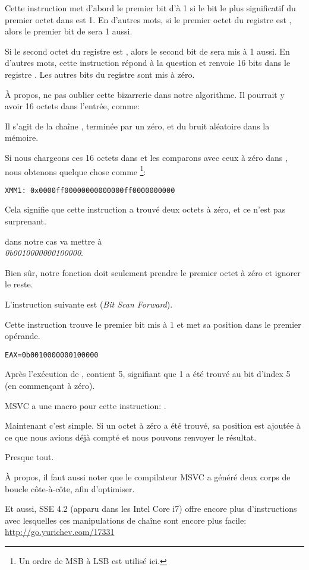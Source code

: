 Cette instruction met d'abord le premier bit d'\EAX à 1 si le bit le plus significatif
du premier octet dans  est 1.
En d'autres mots, si le premier octet du registre  est , alors le
premier bit de \EAX sera 1 aussi.

Si le second octet du registre  est , alors le second bit de \EAX
sera mis à 1 aussi.
En d'autres mots, cette instruction répond à la question  et renvoie
16 bits dans le registre \EAX.
Les autres bits du registre \EAX sont mis à zéro.

À propos, ne pas oublier cette bizarrerie dans notre algorithme.
Il pourrait y avoir 16 octets dans l'entrée, comme:



Il s'agit de la chaîne , terminée par un zéro, et du bruit aléatoire
dans la mémoire.

Si nous chargeons ces 16 octets dans  et les comparons avec ceux à zéro dans
, nous obtenons quelque chose comme \footnote{Un ordre de \ac{MSB} à \ac{LSB}
est utilisé ici.}:

\begin{verbatim}
XMM1: 0x0000ff00000000000000ff0000000000
\end{verbatim}

Cela signifie que cette instruction a trouvé deux octets à zéro, et ce n'est pas
surprenant.

 dans notre cas va mettre \EAX à\\
\emph{0b0010000000100000}.

Bien sûr, notre fonction doit seulement prendre le premier octet à zéro et ignorer
le reste.

\label{instruction_BSF}
L'instruction suivante est  (\emph{Bit Scan Forward}).

Cette instruction trouve le premier bit mis à 1 et met sa position dans le premier
opérande.

\begin{verbatim}
EAX=0b0010000000100000
\end{verbatim}

Après l'exécution de , \EAX contient 5, signifiant que 1 a été trouvé
au bit d'index 5 (en commençant à zéro).

MSVC a une macro pour cette instruction: .

Maintenant c'est simple. Si un octet à zéro a été trouvé, sa position est ajoutée
à ce que nous avions déjà compté et nous pouvons renvoyer le résultat.

Presque tout.

À propos, il faut aussi noter que le compilateur MSVC a généré deux corps de boucle
côte-à-côte, afin d'optimiser.

Et aussi, SSE 4.2 (apparu dans les Intel Core i7) offre encore plus d'instructions
avec lesquelles ces manipulations de chaîne sont encore plus facile: \url{http://go.yurichev.com/17331}

